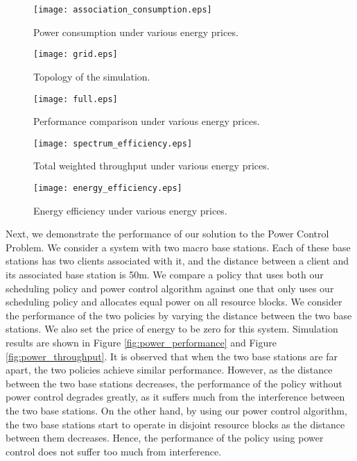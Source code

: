 \documentclass[conference]{IEEEtran}
\begin{document}
\begin{figure}[t]
\centering
\texttt{[image: association\_consumption.eps]}
\caption{Power consumption under various energy prices.}
\label{fig:association_consumption}
\end{figure}

\begin{figure}[t]
\centering
\texttt{[image: grid.eps]}
\caption{Topology of the simulation.}
\label{fig:grid}
\end{figure}

\begin{figure}[t]
\centering
\texttt{[image: full.eps]}
\caption{Performance comparison under various energy prices.}
\label{fig:full}
\end{figure}

\begin{figure}[t]
\centering
\texttt{[image: spectrum\_efficiency.eps]}
\caption{Total weighted throughput under various energy prices.}
\label{fig:spectrum_efficiency}
\end{figure}

\begin{figure}[t]
\centering
\texttt{[image: energy\_efficiency.eps]}
\caption{Energy efficiency under various energy prices.}
\label{fig:energy_efficiency}
\end{figure}


Next, we demonstrate the performance of our solution to the Power Control Problem. We consider a system with two macro base stations. Each of these base stations has two clients associated with it, and the distance between a client and its associated base station is 50m. We compare a policy that uses both our scheduling policy and power control algorithm against one that only uses our scheduling policy and allocates equal power on all resource blocks. We consider the performance of the two policies by varying the distance between the two base stations. We also set the price of energy to be zero for this system. Simulation results are shown in Figure \ref{fig:power_performance} and Figure \ref{fig:power_throughput}. It is observed that when the two base stations are far apart, the two policies achieve similar performance. However, as the distance between the two base stations decreases, the performance of the policy without power control degrades greatly, as it suffers much from the interference between the two base stations. On the other hand, by using our power control algorithm, the two base stations start to operate in disjoint resource blocks as the distance between them decreases. Hence, the performance of the policy using power control does not suffer too much from interference.
\end{document}
